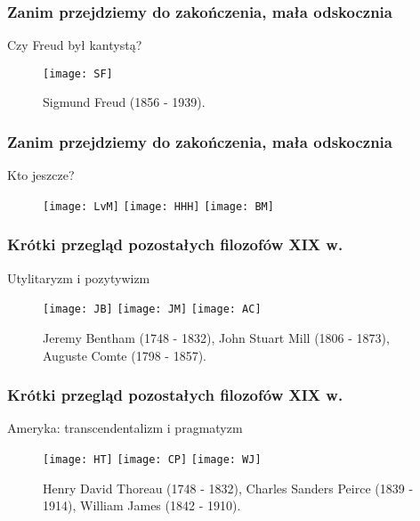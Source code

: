\begin{frame}
\frametitle{Zanim przejdziemy do zakończenia, mała odskocznia}
\begin{block}{Czy Freud był kantystą?}
\begin{figure}
\centering
\texttt{[image: SF]}
\caption{Sigmund Freud  (1856 - 1939).}
\end{figure}
\end{block}
\end{frame}

\begin{frame}
\frametitle{Zanim przejdziemy do zakończenia, mała odskocznia}

\begin{block}{Kto jeszcze?}
\begin{figure}
\centering
\texttt{[image: LvM]}
\texttt{[image: HHH]}
\texttt{[image: BM]}
\end{figure}
\end{block}
\end{frame}

\begin{frame}
\frametitle{Krótki przegląd pozostałych filozofów XIX w.}
\begin{block}{Utylitaryzm i pozytywizm}
\begin{figure}
\centering
\texttt{[image: JB]}
\texttt{[image: JM]}
\texttt{[image: AC]}
\caption{Jeremy Bentham (1748 - 1832), John Stuart Mill (1806 \newline- 1873), Auguste Comte (1798 - 1857).}
\end{figure}
\end{block}
\end{frame}

\begin{frame}
\frametitle{Krótki przegląd pozostałych filozofów XIX w.}
\begin{block}{Ameryka: transcendentalizm i pragmatyzm}
\begin{figure}
\centering
\texttt{[image: HT]}
\texttt{[image: CP]}
\texttt{[image: WJ]}
\caption{Henry David Thoreau (1748 - 1832), Charles Sanders Peirce (1839 - 1914), William James (1842 - 1910).}
\end{figure}
\end{block}
\end{frame}

